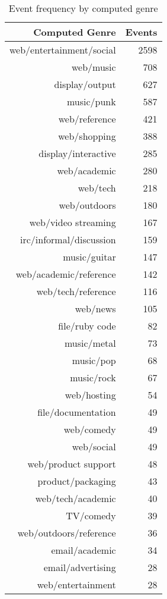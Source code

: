 \begin{longtable}{rr}
\caption{Event frequency by computed genre}
\label{table:personal:eventcountbygenre} \\
      \hline
      Computed Genre & Events \\ 
      \hline
      \endfirsthead
      web/entertainment/social & 2598 \\ 
      web/music & 708 \\ 
      display/output & 627 \\ 
      music/punk & 587 \\ 
      web/reference & 421 \\ 
      web/shopping & 388 \\ 
      display/interactive & 285 \\ 
      web/academic & 280 \\ 
      web/tech & 218 \\ 
      web/outdoors & 180 \\ 
      web/video streaming & 167 \\ 
      irc/informal/discussion & 159 \\ 
      music/guitar & 147 \\ 
      web/academic/reference & 142 \\ 
      web/tech/reference & 116 \\ 
      web/news & 105 \\ 
      file/ruby code &  82 \\ 
      music/metal &  73 \\ 
      music/pop &  68 \\ 
      music/rock &  67 \\ 
      web/hosting &  54 \\ 
      file/documentation &  49 \\ 
      web/comedy &  49 \\ 
      web/social &  49 \\ 
      web/product support &  48 \\ 
      product/packaging &  43 \\ 
      web/tech/academic &  40 \\ 
      TV/comedy &  39 \\ 
      web/outdoors/reference &  36 \\ 
      email/academic &  34 \\ 
      email/advertising &  28 \\ 
      web/entertainment &  28 \\ 

\end{longtable}
